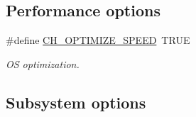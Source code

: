 \subsection*{Performance options}
\begin{DoxyCompactItemize}
\item 
\#define \hyperlink{group__config_gaa5a3d403206b04dfa43ee769e8a220c6}{C\+H\+\_\+\+O\+P\+T\+I\+M\+I\+Z\+E\+\_\+\+S\+P\+E\+E\+D}~T\+R\+U\+E
\begin{DoxyCompactList}\small\item\em O\+S optimization. \end{DoxyCompactList}\end{DoxyCompactItemize}
\subsection*{Subsystem options}
